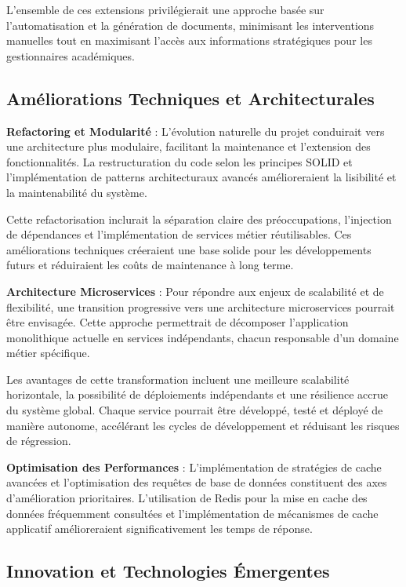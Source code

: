 \documentclass[12pt,a4paper]{report}
\begin{document}
L'ensemble de ces extensions privilégierait une approche basée sur l'automatisation et la génération de documents, minimisant les interventions manuelles tout en maximisant l'accès aux informations stratégiques pour les gestionnaires académiques.

\subsection{Améliorations Techniques et Architecturales}

\textbf{Refactoring et Modularité} : L'évolution naturelle du projet conduirait vers une architecture plus modulaire, facilitant la maintenance et l'extension des fonctionnalités. La restructuration du code selon les principes SOLID et l'implémentation de patterns architecturaux avancés amélioreraient la lisibilité et la maintenabilité du système.

Cette refactorisation inclurait la séparation claire des préoccupations, l'injection de dépendances et l'implémentation de services métier réutilisables. Ces améliorations techniques créeraient une base solide pour les développements futurs et réduiraient les coûts de maintenance à long terme.

\textbf{Architecture Microservices} : Pour répondre aux enjeux de scalabilité et de flexibilité, une transition progressive vers une architecture microservices pourrait être envisagée. Cette approche permettrait de décomposer l'application monolithique actuelle en services indépendants, chacun responsable d'un domaine métier spécifique.

Les avantages de cette transformation incluent une meilleure scalabilité horizontale, la possibilité de déploiements indépendants et une résilience accrue du système global. Chaque service pourrait être développé, testé et déployé de manière autonome, accélérant les cycles de développement et réduisant les risques de régression.

\textbf{Optimisation des Performances} : L'implémentation de stratégies de cache avancées et l'optimisation des requêtes de base de données constituent des axes d'amélioration prioritaires. L'utilisation de Redis pour la mise en cache des données fréquemment consultées et l'implémentation de mécanismes de cache applicatif amélioreraient significativement les temps de réponse.

\subsection{Innovation et Technologies Émergentes}
\end{document}
